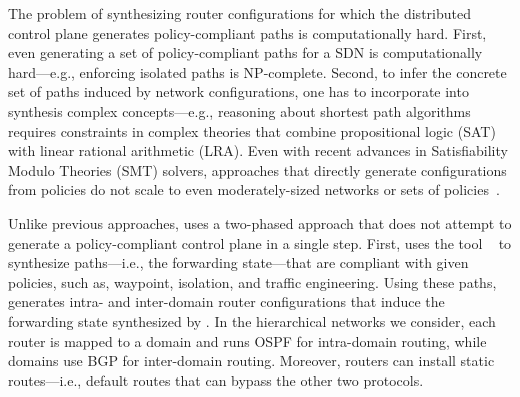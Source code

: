 The problem of synthesizing router configurations
for which the distributed control plane 
generates policy-compliant paths 
is computationally hard. 
First, even generating a set of policy-compliant 
paths for a SDN  is 
computationally hard---e.g., enforcing isolated
paths is NP-complete. 
Second, to infer the concrete
set of paths induced by network configurations, 
one has to incorporate
into synthesis
complex concepts---e.g., reasoning about shortest path algorithms
requires constraints in complex
theories that combine propositional logic (SAT) 
with linear rational
arithmetic (LRA). Even with recent 
advances in Satisfiability Modulo Theories
(SMT) solvers, 
approaches that directly generate configurations  from policies
do not scale to
even moderately-sized networks or 
sets of policies~\cite{synet}.


Unlike previous approaches, \name uses a two-phased approach
that does not attempt to generate 
a policy-compliant control plane in a single step.
First, \name 
uses the tool \genesis~\cite{genesis}
to synthesize paths---i.e., the forwarding state---that are compliant
with given policies, such as, waypoint, isolation,
and traffic engineering.
Using these paths, \name generates 
intra- and inter-domain router configurations
that induce the forwarding
state synthesized by \genesis {}. 
In the hierarchical networks we consider, each router is mapped to a domain and runs
OSPF for intra-domain routing, while domains use BGP for inter-domain
routing. Moreover, routers can install static routes---i.e., default routes that can bypass the other two protocols.


